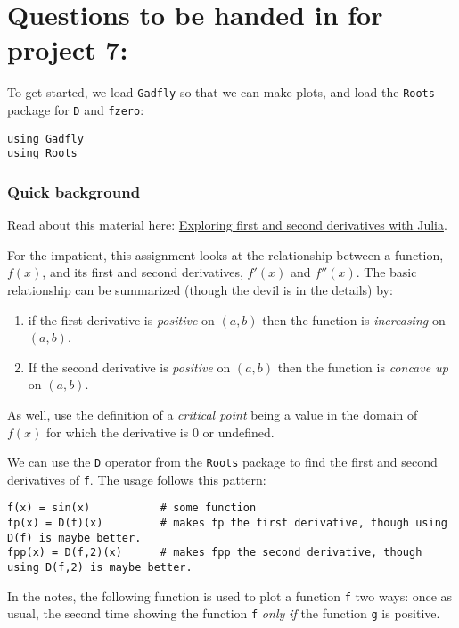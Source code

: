 \documentclass[12pt]{article}
\begin{document}
\section{Questions to be handed in for project 7:}

To get started, we load \texttt{Gadfly} so that we can make plots, and
load the \texttt{Roots} package for \texttt{D} and \texttt{fzero}:



\begin{verbatim}
using Gadfly            
using Roots         
\end{verbatim}
\subsubsection{Quick background}

Read about this material here:
\href{http://mth229.github.io/first-second-derivatives.html}{Exploring
first and second derivatives with Julia}.

For the impatient, this assignment looks at the relationship between a
function, $f(x)$, and its first and second derivatives, $f'(x)$ and
$f''(x)$. The basic relationship can be summarized (though the devil is
in the details) by:

\begin{enumerate}
\def\labelenumi{\arabic{enumi})}
\item
  if the first derivative is \emph{positive} on $(a,b)$ then the
  function is \emph{increasing} on $(a,b)$.
\item
  If the second derivative is \emph{positive} on $(a,b)$ then the
  function is \emph{concave up} on $(a,b)$.
\end{enumerate}

As well, use the definition of a \emph{critical point} being a value in
the domain of $f(x)$ for which the derivative is $0$ or undefined.

We can use the \texttt{D} operator from the \texttt{Roots} package to
find the first and second derivatives of \texttt{f}. The usage follows
this pattern:



\begin{verbatim}
f(x) = sin(x)           # some function
fp(x) = D(f)(x)         # makes fp the first derivative, though using D(f) is maybe better.
fpp(x) = D(f,2)(x)      # makes fpp the second derivative, though using D(f,2) is maybe better.
\end{verbatim}
In the notes, the following function is used to plot a function
\texttt{f} two ways: once as usual, the second time showing the function
\texttt{f} \emph{only if} the function \texttt{g} is positive.
\end{document}
